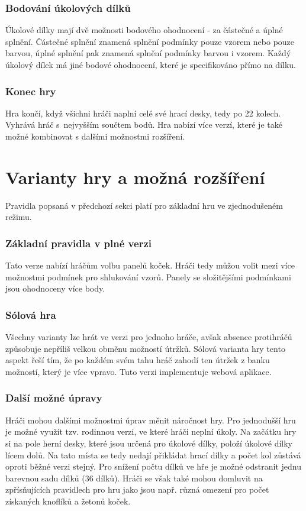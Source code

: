 \subsubsection*{Bodování úkolových dílků}
Úkolové dílky mají dvě možnosti bodového ohodnocení - za částečné a úplné splnění. Částečné splnění znamená splnění podmínky pouze vzorem nebo pouze barvou, úplné splnění pak znamená splnění podmínky barvou i vzorem. Každý úkolový dílek má jiné bodové ohodnocení, které je specifikováno přímo na dílku.


\subsubsection*{Konec hry}

Hra končí, když všichni hráči naplní celé své hrací desky, tedy po 22 kolech. Vyhrává hráč s~nejvyšším součtem bodů. Hra nabízí více verzí, které je také možné kombinovat s dalšími možnostmi rozšíření.


\section{Varianty hry a možná rozšíření}

Pravidla popsaná v předchozí sekci platí pro základní hru ve zjednodušeném režimu.

\subsubsection*{Základní pravidla v plné verzi}
Tato verze nabízí hráčům volbu panelů koček. Hráči tedy můžou volit mezi více možnostmi podmínek pro shlukování vzorů. Panely se složitějšími podmínkami jsou ohodnoceny více body.

\subsubsection*{Sólová hra}
Všechny varianty lze hrát ve verzi pro jednoho hráče, avšak absence protihráčů způsobuje nepříliš velkou obměnu možností útržků. Sólová varianta hry tento aspekt řeší tím, že po každém svém tahu hráč zahodí ten útržek z banku možností, který je více vpravo. Tuto verzi implementuje webová aplikace. 

\subsubsection*{Další možné úpravy}
Hráči mohou dalšími možnostmi úprav měnit náročnost hry. Pro jednodušší hru je možné využít tzv. rodinnou verzi, ve které hráči neplní úkoly. Na začátku hry si na pole herní desky, které jsou určená pro úkolové dílky, položí úkolové dílky lícem dolů. Na tato místa se tedy nedají přikládat hrací dílky a počet kol zůstává oproti běžné verzi stejný. Pro snížení počtu dílků ve hře je možné odstranit jednu barevnou sadu dílků (36 dílků). Hráči se však také mohou domluvit na zpřísňujících pravidlech pro hru jako jsou např. různá omezení pro počet získaných knoflíků a žetonů koček.

